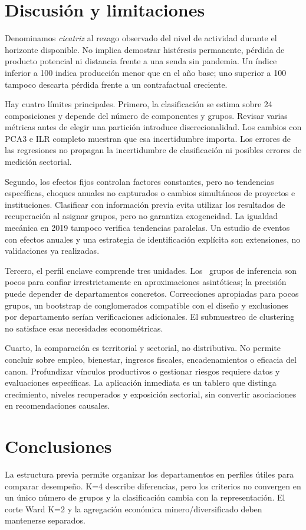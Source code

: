 \section{Discusión y limitaciones}
Denominamos \textit{cicatriz} al rezago observado del nivel de actividad durante el horizonte disponible. No implica demostrar histéresis permanente, pérdida de producto potencial ni distancia frente a una senda sin pandemia. Un índice inferior a 100 indica producción menor que en el año base; uno superior a 100 tampoco descarta pérdida frente a un contrafactual creciente.

Hay cuatro límites principales. Primero, la clasificación se estima sobre 24 composiciones y depende del número de componentes y grupos. Revisar varias métricas antes de elegir una partición introduce discrecionalidad. Los cambios con PCA3 e ILR completo muestran que esa incertidumbre importa. Los errores de las regresiones no propagan la incertidumbre de clasificación ni posibles errores de medición sectorial.

Segundo, los efectos fijos controlan factores constantes, pero no tendencias específicas, choques anuales no capturados o cambios simultáneos de proyectos e instituciones. Clasificar con información previa evita utilizar los resultados de recuperación al asignar grupos, pero no garantiza exogeneidad. La igualdad mecánica en 2019 tampoco verifica tendencias paralelas. Un estudio de eventos con efectos anuales y una estrategia de identificación explícita son extensiones, no validaciones ya realizadas.

Tercero, el perfil enclave comprende tres unidades. Los \Departments\ grupos de inferencia son pocos para confiar irrestrictamente en aproximaciones asintóticas; la precisión puede depender de departamentos concretos. Correcciones apropiadas para pocos grupos, un bootstrap de conglomerados compatible con el diseño y exclusiones por departamento serían verificaciones adicionales. El submuestreo de clustering no satisface esas necesidades econométricas.

Cuarto, la comparación es territorial y sectorial, no distributiva. No permite concluir sobre empleo, bienestar, ingresos fiscales, encadenamientos o eficacia del canon. Profundizar vínculos productivos o gestionar riesgos requiere datos y evaluaciones específicas. La aplicación inmediata es un tablero que distinga crecimiento, niveles recuperados y exposición sectorial, sin convertir asociaciones en recomendaciones causales.

\section{Conclusiones}
La estructura previa permite organizar los departamentos en perfiles útiles para comparar desempeño. K=4 describe diferencias, pero los criterios no convergen en un único número de grupos y la clasificación cambia con la representación. El corte Ward K=2 y la agregación económica minero/diversificado deben mantenerse separados.

